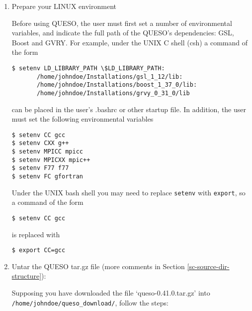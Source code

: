 \begin{enumerate}
\item {Prepare your LINUX environment %



Before using QUESO, the user must first set a number of environmental variables, and indicate the full path
of the QUESO's dependencies: GSL, Boost and GVRY. For example, under the UNIX C shell (csh) a command of the form
\begin{verbatim}
$ setenv LD_LIBRARY_PATH \$LD_LIBRARY_PATH:
       /home/johndoe/Installations/gsl_1_12/lib:
       /home/johndoe/Installations/boost_1_37_0/lib:
       /home/johndoe/Installations/grvy_0_31_0/lib
\end{verbatim}
can be placed in the user's .bashrc or other startup file. In addition, the user must set the following environmental
variables
\begin{verbatim}
$ setenv CC gcc
$ setenv CXX g++
$ setenv MPICC mpicc
$ setenv MPICXX mpic++
$ setenv F77 f77
$ setenv FC gfortran
\end{verbatim}


Under the UNIX bash shell you may need to replace \texttt{setenv} with \texttt{export}, so a command of the form
\begin{verbatim}
$ setenv CC gcc
\end{verbatim}
is replaced with
\begin{verbatim}
$ export CC=gcc
\end{verbatim}

}




\item {Untar the QUESO tar.gz file (more comments in Section \ref{sc-source-dir-structure}): %

Supposing you have downloaded the file `queso-0.41.0.tar.gz' into \texttt{/home/johndoe/queso\_download/}, follow the steps:

}
\end{enumerate}

